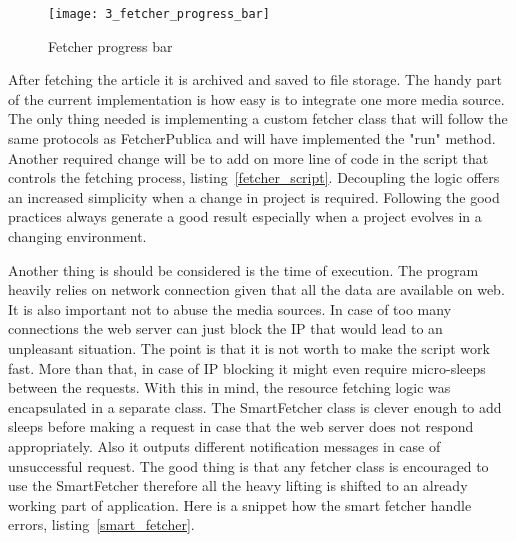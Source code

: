 \begin{figure}[!ht]
\centering
\texttt{[image: 3\_fetcher\_progress\_bar]}
\caption{Fetcher progress bar}\label{fetcher_progress_bar}
\end{figure}

After fetching the article it is archived and saved to file storage. The handy part of the current implementation is how easy is to integrate one more media source. The only thing needed is implementing a custom fetcher class that will follow the same protocols as FetcherPublica and will have implemented the "run" method. Another required change will be to add on more line of code in the script that controls the fetching process, \mbox{listing \ref{fetcher_script}}. Decoupling the logic offers an increased simplicity when a change in project is required. Following the good practices always generate a good result especially when a project evolves in a changing environment.





Another thing is should be considered is the time of execution. The program heavily relies on network connection given that all the data are available on web. It is also important not to abuse the media sources. In case of too many connections the web server can just block the IP that would lead to an unpleasant situation. The point is that it is not worth to make the script work fast. More than that, in case of IP blocking it might even require micro-sleeps between the requests. With this in mind, the resource fetching logic was encapsulated in a separate class. The SmartFetcher class is clever enough to add sleeps before making a request in case that the web server does not respond appropriately. Also it outputs different notification messages in case of unsuccessful request. The good thing is that any fetcher class is encouraged to use the SmartFetcher therefore all the heavy lifting is shifted to an already working part of application. Here is a snippet how the smart fetcher handle errors, \mbox{listing \ref{smart_fetcher}}.



